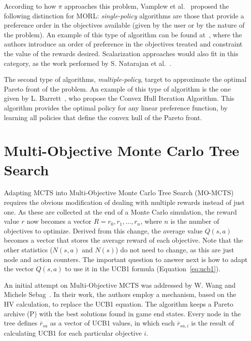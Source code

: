 \documentclass[journal]{IEEEtran}
\begin{document}
According to how $\pi$ approaches this problem, Vamplew et al.~\cite{Vamplew2010} proposed the following distinction for MORL: \textit{single-policy} algorithms are those that provide a preference order in the objectives available (given by the user or by the nature of the problem). An example of this type of algorithm can be found at~\cite{Gabor1998}, where the authors introduce an order of preference in the objectives treated and constraint the value of the rewards desired. Scalarization approaches would also fit in this category, as the work performed by S. Natarajan et al.~\cite{Natarajan2005}.

The second type of algorithms, \textit{multiple-policy}, target to approximate the optimal Pareto front of the problem. An example of this type of algorithm is the one given by L. Barrett~\cite{Barrett2008}, who propose the Convex Hull Iteration Algorithm. This algorithm provides the optimal policy for any linear preference function, by learning all policies that define the convex hull of the Pareto front.

\section{Multi-Objective Monte Carlo Tree Search} \label{sec:momcts}

Adapting MCTS into Multi-Objective Monte Carlo Tree Search (MO-MCTS) requires the obvious modification of dealing with multiple rewards instead of just one. As these are collected at the end of a Monte Carlo simulation, the reward value $r$ now becomes a vector $R = {r_0, r_1, \dots, r_n}$, where $n$ is the number of objectives to optimize. Derived from this change, the average value $Q(s,a)$ becomes a vector that stores the average reward of each objective. Note that the other statistics ($N(s,a)$ and $N(s)$) do not need to change, as this are just node and action counters. The important question to answer next is how to adapt the vector $Q(s,a)$ to use it in the UCB1 formula (Equation~\ref{eq:ucb1}). 

An initial attempt on Multi-Objective MCTS was addressed by W. Wang and Michele Sebag~\cite{Weijia2012, Weijia2013}. In their work, the authors employ a mechanism, based on the HV calculation, to replace the UCB1 equation. The algorithm keeps a Pareto archive (P) with the best solutions found in game end states. Every node in the tree defines $\overline{r}_{sa}$ as a vector of UCB1 values, in which each $\overline{r}_{sa, i}$ is the result of calculating UCB1 for each particular objective $i$.
\end{document}
